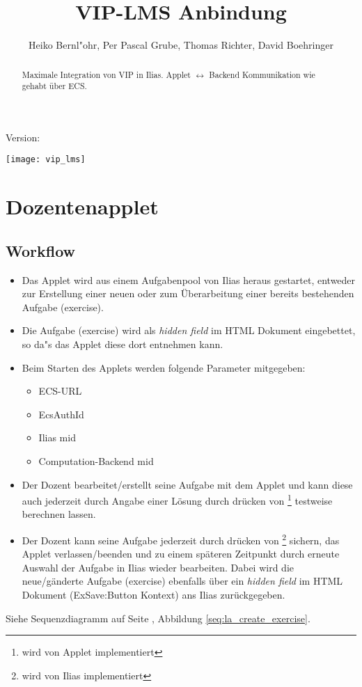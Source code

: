 \documentclass[12pt,a4paper]{article}
\newcommand{\button}[1]{\fbox{\texttt{#1}}}
\begin{document}
\title{VIP-LMS Anbindung}
\author{Heiko Bernl"ohr, Per Pascal Grube, Thomas Richter, David Boehringer}
\maketitle
\begin{center}
  Version: \gitVtag\\
\end{center}
\begin{abstract}
  Maximale Integration von VIP in Ilias. Applet $\leftrightarrow$ Backend
  Kommunikation wie gehabt über ECS.
\end{abstract}

\vspace{\fill}
\begin{center}
\texttt{[image: vip\_lms]}
\end{center}
\vspace{\fill}

\newpage

\section{Dozentenapplet}
\subsection{Workflow}
\begin{itemize}
  \item Das Applet wird aus einem Aufgabenpool von Ilias heraus gestartet,
    entweder zur Erstellung einer neuen oder zum Überarbeitung einer bereits
    bestehenden Aufgabe (exercise).
  \item Die Aufgabe (exercise) wird als \textit{hidden field} im HTML
    Dokument eingebettet, so da"s das Applet diese dort entnehmen kann.
  \item Beim Starten des Applets werden folgende Parameter mitgegeben:
    \begin{itemize}
      \item ECS-URL
      \item EcsAuthId
      \item Ilias mid
      \item Computation-Backend mid
    \end{itemize}
  \item Der Dozent bearbeitet/erstellt seine Aufgabe mit dem Applet und kann
    diese auch jederzeit durch Angabe einer Lösung durch drücken von
    \button{berechnen}\footnote{wird von Applet implementiert} testweise
    berechnen lassen.
  \item Der Dozent kann seine Aufgabe jederzeit durch drücken von
    \button{speichern}\footnote{wird von Ilias implementiert} sichern, das
    Applet verlassen/beenden und zu einem späteren Zeitpunkt durch erneute
    Auswahl der Aufgabe in Ilias wieder bearbeiten. Dabei wird die
    neue/gänderte Aufgabe (exercise) ebenfalls über ein \textit{hidden field}
    im HTML Dokument (ExSave:Button Kontext) ans Ilias zurückgegeben.
\end{itemize}
Siehe Sequenzdiagramm auf Seite \pageref{seq:la_create_exercise}, Abbildung \ref{seq:la_create_exercise}.
\end{document}
